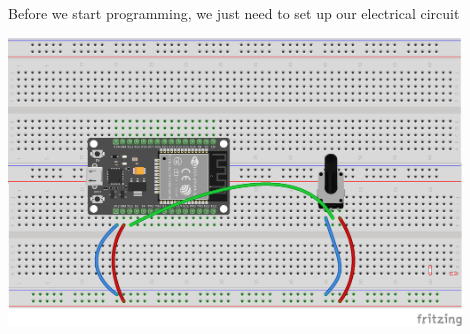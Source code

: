 \documentclass[12pt, a4paper]{article}
\begin{document}
Before we start programming, we just need to set up our electrical circuit

\begin{center}
  \includegraphics[width=12cm, keepaspectratio]{fritzing/analogInput_potentiometer.png}
\end{center}


\end{document}
